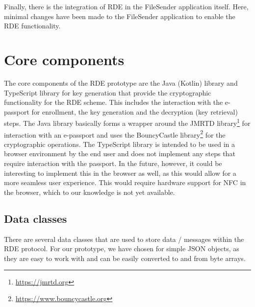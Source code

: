 Finally, there is the integration of RDE in the FileSender application itself.
Here, minimal changes have been made to the FileSender application to enable the RDE functionality.

\section{Core components}\label{sec:core-components}
The core components of the RDE prototype are the Java (Kotlin) library and TypeScript library for key generation that provide the cryptographic functionality for the RDE scheme.
This includes the interaction with the e-passport for enrollment, the key generation and the decryption (key retrieval) steps.
The Java library basically forms a wrapper around the JMRTD library\footnote{\url{https://jmrtd.org}} for interaction with an e-passport and uses the BouncyCastle library\footnote{\url{https://www.bouncycastle.org}} for the cryptographic operations.
The TypeScript library is intended to be used in a browser environment by the end user and does not implement any steps that require interaction with the passport.
In the future, however, it could be interesting to implement this in the browser as well, as this would allow for a more seamless user experience.
This would require hardware support for NFC in the browser, which to our knowledge is not yet available.

\subsection{Data classes}\label{subsec:data-classes}
There are several data classes that are used to store data / messages within the RDE protocol.
For our prototype, we have chosen for simple JSON objects, as they are easy to work with and can be easily converted to and from byte arrays.

